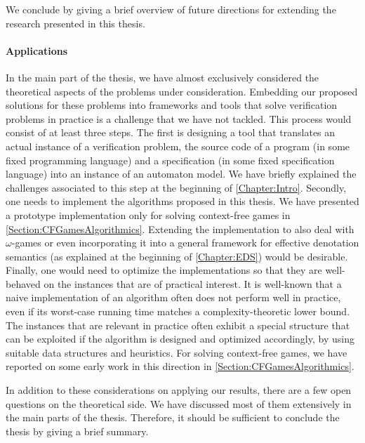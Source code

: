 \documentclass[../../diss.tex]{subfiles}
\begin{document}

We conclude by giving a brief overview of future directions for extending the research presented in this thesis.

\paragraph{Applications}

In the main part of the thesis, we have almost exclusively considered the theoretical aspects of the problems under consideration.
Embedding our proposed solutions for these problems into frameworks and tools that solve verification problems in practice is a challenge that we have not tackled.
This process would consist of at least three steps.
The first is designing a tool that translates an actual instance of a verification problem, \eg the source code of a program (in some fixed programming language) and a specification (in some fixed specification language) into an instance of an automaton model.
We have briefly explained the challenges associated to this step at the beginning of \cref{Chapter:Intro}.
Secondly, one needs to implement the algorithms proposed in this thesis.
We have presented a prototype implementation only for solving context-free games in \cref{Section:CFGamesAlgorithmics}.
Extending the implementation to also deal with $\omega$-games or even incorporating it into a general framework for effective denotation semantics (as explained at the beginning of \cref{Chapter:EDS}) would be desirable.
Finally, one would need to optimize the implementations so that they are well-behaved on the instances that are of practical interest.
It is well-known that a naive implementation of an algorithm often does not perform well in practice, even if its worst-case running time matches a complexity-theoretic lower bound.
The instances that are relevant in practice often exhibit a special structure that can be exploited if the algorithm is designed and optimized accordingly, \eg by using suitable data structures and heuristics.
For solving context-free games, we have reported on some early work in this direction in \cref{Section:CFGamesAlgorithmics}.

In addition to these considerations on applying our results, there are a few open questions on the theoretical side.
We have discussed most of them extensively in the main parts of the thesis.
Therefore, it should be sufficient to conclude the thesis by giving a brief summary.
\end{document}
